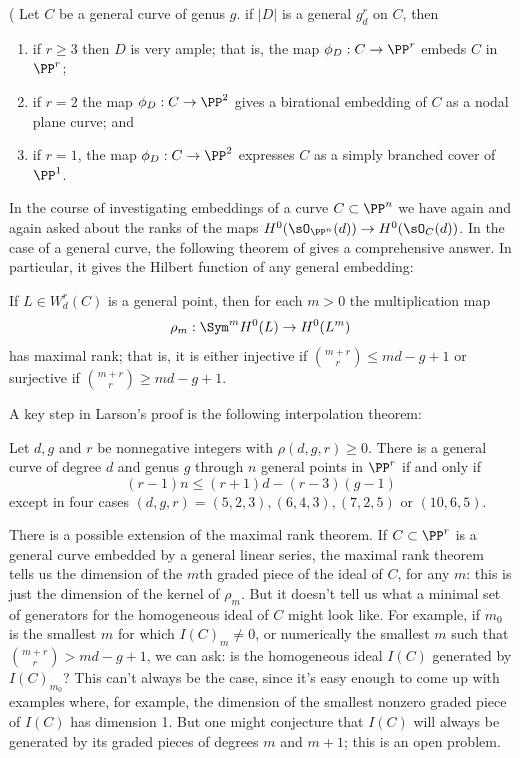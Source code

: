 \begin{theorem}\label{grd omnibus}(\cite[Proposition 5.4]{Eisenbud-Harris83}
Let $C$ be a general curve of genus $g$.
 if $|D|$ is a general $g^r_d$ on $C$, then

 \begin{enumerate}
\item if $r \geq 3$ then $D$ is very ample; that is, the map $\phi_D : C \to \PP^r$   embeds $C$ in $\PP^r$;
\item if $r=2$ the map $\phi_D : C \to \PP^2$ gives a birational embedding of $C$ as a nodal plane curve; and 
\item if $r=1$, the map $\phi_D : C \to \PP^2$ expresses $C$ as a simply branched cover of $\PP^1$.
\end{enumerate}
\end{theorem}



In the course of investigating embeddings of a curve $C\subset \PP^n$ we have again and again
asked about the ranks of the maps $H^0(\sO_{\PP^n}(d)) \to H^0(\sO_C(d))$. In the case of
a general curve, the following theorem of \cite{ELarson2018} gives a comprehensive answer. In particular, it gives
 the Hilbert function of any general embedding:
 
\begin{theorem} \label{maximal rank}
If $L \in W^r_d(C)$ is a general point, then for each $m > 0$ the multiplication map
$$
\rho_m : \Sym^m H^0(L) \to H^0(L^m)
$$
has maximal rank; that is, it is either injective if $\binom{m+r}{r} \leq md-g+1$ or surjective if $\binom{m+r}{r} \geq md-g+1$.
\end{theorem}

A key step in Larson's proof is the following interpolation theorem:

\begin{theorem}\cite{Larson-Vogt}
Let $d, g$ and $r$
be nonnegative integers with $\rho(d, g, r) \geq 0$. There is a general curve of degree $d$ and genus $g$ through $n$ general
points in $\PP^r$
if and only if
$$
(r-1)n \leq (r + 1)d-(r-3)(g-1)
$$
except in four cases $(d, g, r) = (5, 2, 3),(6, 4, 3),(7, 2, 5)$ or $(10, 6, 5)$.

 \end{theorem}
 
There is a possible extension of the maximal rank theorem. If $C \subset \PP^r$ is a general curve embedded by a general linear series, the maximal rank theorem tells us the dimension of the $m$th graded piece of the ideal of $C$, for any $m$: this is just the dimension of the kernel of $\rho_m$. But it doesn't tell us what a minimal set of generators for the homogeneous ideal of $C$ might look like. For example, if $m_0$ is the smallest $m$ for which $I(C)_m \neq 0$, or numerically the smallest $m$ such that $\binom{m+r}{r} > md-g+1$, we can ask: is the homogeneous ideal $I(C)$ generated by $I(C)_{m_0}$? This can't always be the case, since it's easy enough to come up with examples where, for example, the dimension of the smallest nonzero graded piece of $I(C)$ has dimension 1. But one might conjecture that $I(C)$ will always be generated by its graded pieces of degrees $m$ and $m+1$; this is an open problem.

